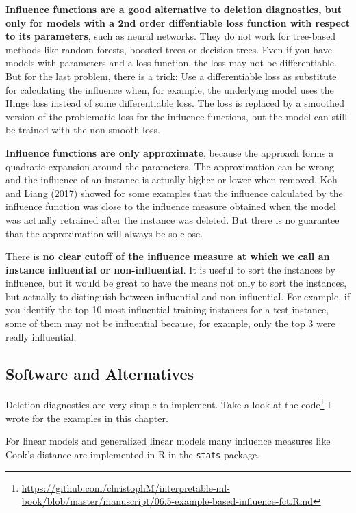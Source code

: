 \documentclass[
  11pt,
]{scrbook}
\renewcommand{\href}[2]{#2\footnote{\url{#1}}}
\begin{document}
\textbf{Influence functions are a good alternative to deletion diagnostics, but only for models with a 2nd order diffentiable loss function with respect to its parameters}, such as neural networks.
They do not work for tree-based methods like random forests, boosted trees or decision trees.
Even if you have models with parameters and a loss function, the loss may not be differentiable.
But for the last problem, there is a trick:
Use a differentiable loss as substitute for calculating the influence when, for example, the underlying model uses the Hinge loss instead of some differentiable loss.
The loss is replaced by a smoothed version of the problematic loss for the influence functions, but the model can still be trained with the non-smooth loss.

\textbf{Influence functions are only approximate}, because the approach forms a quadratic expansion around the parameters.
The approximation can be wrong and the influence of an instance is actually higher or lower when removed.
Koh and Liang (2017) showed for some examples that the influence calculated by the influence function was close to the influence measure obtained when the model was actually retrained after the instance was deleted.
But there is no guarantee that the approximation will always be so close.

There is \textbf{no clear cutoff of the influence measure at which we call an instance influential or non-influential}.
It is useful to sort the instances by influence, but it would be great to have the means not only to sort the instances, but actually to distinguish between influential and non-influential.
For example, if you identify the top 10 most influential training instances for a test instance, some of them may not be influential because, for example, only the top 3 were really influential.

\hypertarget{software-and-alternatives-5}{%
\subsection{Software and Alternatives}\label{software-and-alternatives-5}}

Deletion diagnostics are very simple to implement.
Take a look at \href{https://github.com/christophM/interpretable-ml-book/blob/master/manuscript/06.5-example-based-influence-fct.Rmd}{the code} I wrote for the examples in this chapter.

For linear models and generalized linear models many influence measures like Cook's distance are implemented in R in the \texttt{stats} package.
\end{document}
